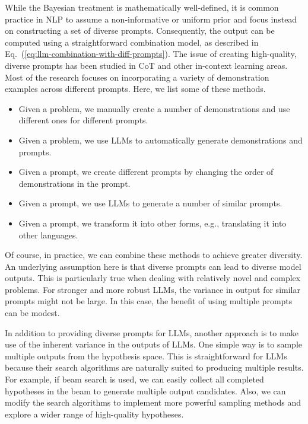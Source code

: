 While the Bayesian treatment is mathematically well-defined, it is common practice in NLP to assume a non-informative or uniform prior and focus instead on constructing a set of diverse prompts. Consequently, the output can be computed using a straightforward combination model, as described in Eq.~(\ref{eq:llm-combination-with-diff-prompts}). The issue of creating high-quality, diverse prompts has been studied in CoT and other in-context learning areas. Most of the research focuses on incorporating a variety of demonstration examples across different prompts. Here, we list some of these methods.

\begin{itemize}
\item \vspace{0.5em} Given a problem, we manually create a number of demonstrations and use different ones for different prompts.
\item \vspace{0.2em} Given a problem, we use LLMs to automatically generate demonstrations and prompts.
\item \vspace{0.2em} Given a prompt, we create different prompts by changing the order of demonstrations in the prompt.
\item \vspace{0.2em} Given a prompt, we use LLMs to generate a number of similar prompts.
\item \vspace{0.2em} Given a prompt, we transform it into other forms, e.g., translating it into other languages.
\end{itemize}
\vspace{0.5em}

Of course, in practice, we can combine these methods to achieve greater diversity. An underlying assumption here is that diverse prompts can lead to diverse model outputs. This is particularly true when dealing with relatively novel and complex problems. For stronger and more robust LLMs, the variance in output for similar prompts might not be large. In this case, the benefit of using multiple prompts can be modest.

In addition to providing diverse prompts for LLMs, another approach is to make use of the inherent variance in the outputs of LLMs. One simple way is to sample multiple outputs from the hypothesis space. This is straightforward for LLMs because their search algorithms are naturally suited to producing multiple results. For example, if beam search is used, we can easily collect all completed hypotheses in the beam to generate multiple output candidates. Also, we can modify the search algorithms to implement more powerful sampling methods and explore a wider range of high-quality hypotheses.

